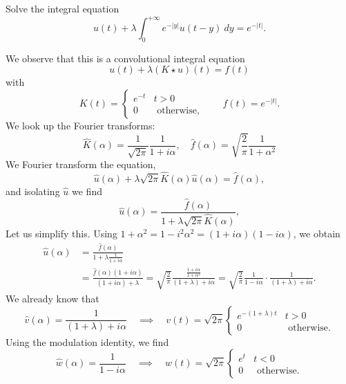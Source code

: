 \documentclass[11pt]{article}
\begin{document}
\begin{exercise}
    Solve the integral equation 
    \[
        u(t) + \lambda \int_{0}^{+\infty} e^{-|y|} u( t - y ) \ dy = e^{-|t|}.
    \]
\end{exercise}
\begin{solution}
    We observe that this is a convolutional integral equation 
    \[
        u(t) + \lambda ( K \star u )(t) = f(t)
    \]
    with 
    \[
        K(t) = \begin{cases} e^{-t} & t > 0 \\ 0 & \text{ otherwise,} \end{cases} 
        \qquad 
        f(t) = e^{-|t|}
        .
    \]
    We look up the Fourier transforms:
    \[
        \hat K(\alpha) = \frac{1}{\sqrt{2\pi}} \frac{1}{ 1 + i \alpha },
        \quad 
        \hat f(\alpha) = \sqrt{ \frac{2}{\pi} } \frac{1}{1+\alpha^2}
    \]
    We Fourier transform the equation, 
    \[
        \hat u(\alpha) + \lambda \sqrt{2\pi} \hat K(\alpha) \hat u(\alpha) = \hat f(\alpha),
    \]
    and isolating $\hat u$ we find 
    \[
        \hat u(\alpha) = \frac{ \hat f(\alpha) }{ 1 + \lambda \sqrt{2\pi} \hat K(\alpha) },
    \]
    Let us simplify this. Using $1+\alpha^{2} = 1 - i^{2}\alpha^{2} = ( 1 + i \alpha) ( 1 - i \alpha )$, we obtain 
    \begin{align*}
        \hat u(\alpha) 
        &
        = 
        \frac{ \hat f(\alpha) }{ 1 + \lambda \frac{1}{ 1 + i \alpha } }
        \\&
        = 
        \frac{ \hat f(\alpha) ( 1 + i \alpha ) }{ ( 1 + i \alpha ) + \lambda }
        =
        \sqrt{ \frac{2}{\pi} } 
        \frac{ \quad \frac{ 1 + i \alpha }{ 1 + \alpha^2 } \quad  }{ ( 1 + \lambda ) + i \alpha }
        =
        \sqrt{ \frac{2}{\pi} } 
        \frac{ 1 }{ 1 - i \alpha }
        \cdot 
        \frac{ 1 }{ ( 1 + \lambda ) + i \alpha }
        .
    \end{align*}
    We already know that 
    \[
        \hat v(\alpha) = \frac{ 1 }{ ( 1 + \lambda ) + i \alpha }
        \quad \implies \quad 
             v(t)      = \sqrt{2\pi} \begin{cases} e^{-( 1 + \lambda )t} & t > 0 \\ 0 & \text{ otherwise.} \end{cases} 
    \]
    Using the modulation identity, we find 
    \[
        \hat w(\alpha) = \frac{ 1 }{ 1 - i \alpha }
        \quad \implies \quad 
             w(t)      = \sqrt{2\pi} \begin{cases} e^{t} & t < 0 \\ 0 & \text{ otherwise.} \end{cases} 
\]
\end{solution}
\end{document}

